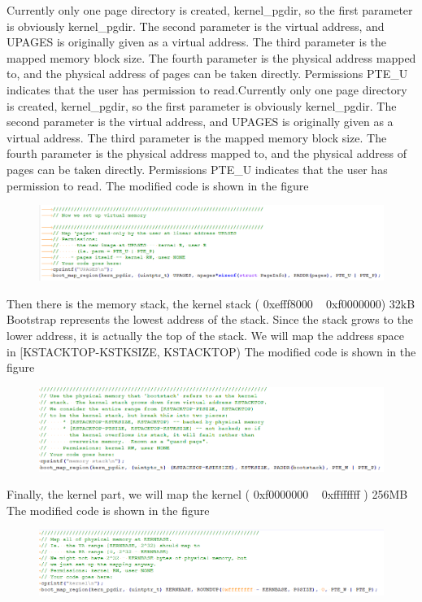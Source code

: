 Currently only one page directory is created, kernel\_pgdir, so the first parameter is obviously kernel\_pgdir. The second parameter is the virtual address, and UPAGES is originally given as a virtual address. The third parameter is the mapped memory block size. The fourth parameter is the physical address mapped to, and the physical address of pages can be taken directly. Permissions PTE\_U indicates that the user has permission to read.Currently only one page directory is created, kernel\_pgdir, so the first parameter is obviously kernel\_pgdir. The second parameter is the virtual address, and UPAGES is originally given as a virtual address. The third parameter is the mapped memory block size. The fourth parameter is the physical address mapped to, and the physical address of pages can be taken directly. Permissions PTE\_U indicates that the user has permission to read.
The modified code is shown in the figure
\begin{figure}[H]
\centering
\includegraphics[width=0.8\linewidth]{figure/mem_init_changed1}
\end{figure}


Then there is the memory stack, the kernel stack ( 0xefff8000 ~ 0xf0000000) 32kB
Bootstrap represents the lowest address of the stack. Since the stack grows to the lower address, it is actually the top of the stack. We will map the address space in [KSTACKTOP-KSTKSIZE, KSTACKTOP)
The modified code is shown in the figure
\begin{figure}[H]
\centering
\includegraphics[width=0.8\linewidth]{figure/mem_init_changed2}
\end{figure}


Finally, the kernel part, we will map the kernel ( 0xf0000000 ~ 0xffffffff ) 256MB
The modified code is shown in the figure
\begin{figure}[H]
\centering
\includegraphics[width=0.8\linewidth]{figure/mem_init_changed3}
\end{figure}


